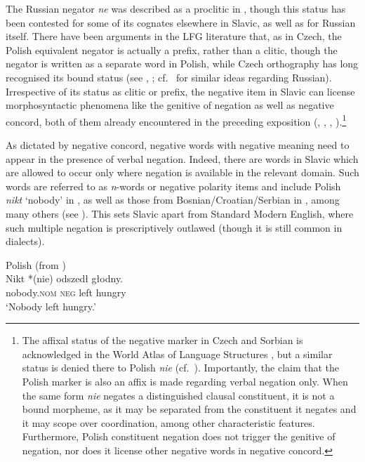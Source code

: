 \documentclass[output=paper,hidelinks]{langscibook}
\begin{document}
The Russian negator \textit{ne} was described as a proclitic in , though this status has been contested for some of its cognates elsewhere in Slavic, as well as for Russian itself. There have been arguments in the LFG literature that, as in Czech, the Polish equivalent negator is actually a prefix, rather than a clitic, though the negator is written as a separate word in Polish, while Czech orthography has long recognised its bound status (see \citealt{PatejukPrzepiorkowski2014b}, \citealt{przepiorkowski2015two}; cf.\ \citealt{King95} for similar ideas regarding Russian). Irrespective of its status as clitic or prefix, the negative item in Slavic can license morphosyntactic phenomena like the genitive of negation as well as negative concord, both of them already encountered in the preceding exposition (, , , ).\footnote{The affixal status of the negative marker in Czech and Sorbian is acknowledged in the World Atlas of Language Structures  \citep{Dryer13b},  but a similar status is denied there to Polish \emph{nie} (cf.\ \citealt[329, fn. 10]{przepiorkowski2015two}).  Importantly, the claim that the Polish marker is also an affix is made regarding verbal negation only. When the same form \textit{nie} negates a distinguished clausal constituent, it is not a bound morpheme, as it may be separated from the constituent it negates and it may scope over coordination, among other characteristic features. Furthermore, Polish constituent negation does not trigger the genitive of negation, nor does it license other negative words in negative concord.}

As dictated by negative concord, negative words with negative meaning need to appear in the presence of verbal negation. Indeed, there are words in Slavic which are allowed to occur only where negation is available in the relevant domain. Such words are referred to as \textit{n}{}-words or negative polarity items and include Polish \textit{nikt} `nobody' in , as well as those from Bosnian/Croatian/Serbian in , among many others (see \citealt[{\textsection}4.3.1]{PatejukPrzepiorkowski2014b}). This sets Slavic apart from Standard Modern English, where such multiple negation is prescriptively outlawed (though it is still common in dialects).

\ea%
    \label{ex:Slavic:30}Polish (from \citealt[ex.~22]{PatejukPrzepiorkowski2014b})\\
    \gll Nikt         *(nie)   odszedł   głodny.\\
        nobody.\textsc{nom}    \textsc{neg}   left     hungry\\
    \glt `Nobody left hungry.'    
    \z
\end{document}
